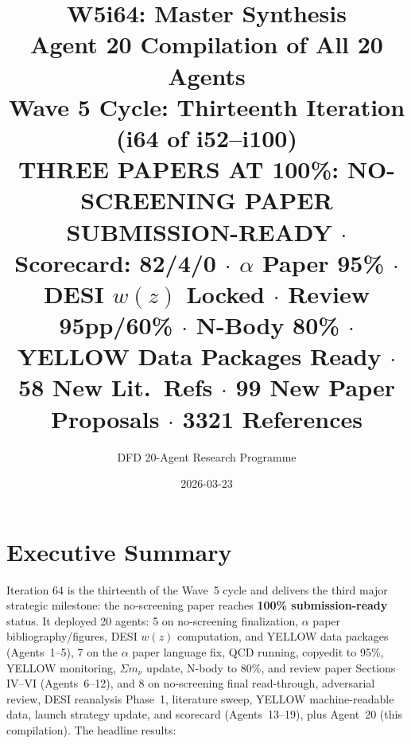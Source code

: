 \documentclass[11pt,a4paper]{article}
\title{\Huge W5i64: Master Synthesis\\[12pt]
\Large Agent 20 Compilation of All 20 Agents\\[6pt]
\large Wave 5 Cycle: Thirteenth Iteration (i64 of i52--i100)\\[6pt]
\normalsize \textbf{THREE PAPERS AT 100\%: NO-SCREENING PAPER SUBMISSION-READY} $\cdot$ Scorecard: 82/4/0 $\cdot$ $\alpha$ Paper 95\% $\cdot$ DESI $w(z)$ Locked $\cdot$ Review 95pp/60\% $\cdot$ N-Body 80\% $\cdot$ YELLOW Data Packages Ready $\cdot$ 58 New Lit.\ Refs $\cdot$ 99 New Paper Proposals $\cdot$ 3321 References}
\author{DFD 20-Agent Research Programme}
\date{2026-03-23}
\begin{document}
\maketitle


\section{Executive Summary}

Iteration 64 is the thirteenth of the Wave~5 cycle and delivers the third major strategic milestone: the no-screening paper reaches \textbf{100\% submission-ready} status. It deployed 20 agents: 5 on no-screening finalization, $\alpha$ paper bibliography/figures, DESI $w(z)$ computation, and YELLOW data packages (Agents~1--5), 7 on the $\alpha$ paper language fix, QCD running, copyedit to 95\%, YELLOW monitoring, $\Sigma m_\nu$ update, N-body to 80\%, and review paper Sections IV--VI (Agents~6--12), and 8 on no-screening final read-through, adversarial review, DESI reanalysis Phase~1, literature sweep, YELLOW machine-readable data, launch strategy update, and scorecard (Agents~13--19), plus Agent~20 (this compilation). The headline results:
\end{document}
